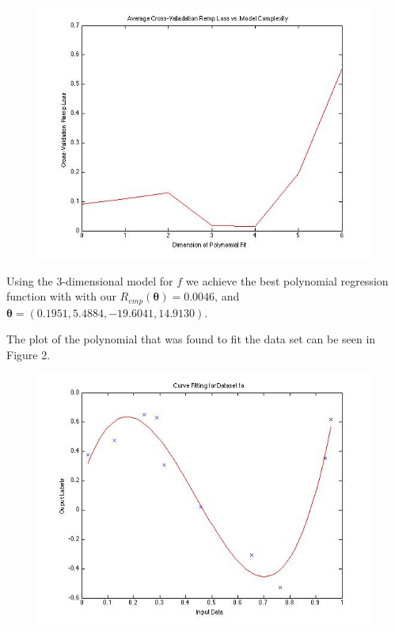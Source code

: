 \documentclass[paper=a4, fontsize=11pt]{scrartcl} %
\numberwithin{equation}{section} %
\numberwithin{figure}{section} %
\numberwithin{table}{section} %
\begin{document}
\begin{figure}
\centering
\includegraphics[scale=0.4]{Prob1_CrossValError.jpg}
\end{figure}

Using the 3-dimensional model for $f$ we achieve the best polynomial regression function with  with our $R_{emp}(\bm{\theta}) = 0.0046$, and $\bm{\theta} = (0.1951, 5.4884, -19.6041, 14.9130)$.

The plot of the polynomial that was found to fit the data set can be seen in Figure 2.

\begin{figure}
\centering
\includegraphics[scale=0.4]{Curve.jpg}
\end{figure}
\end{document}
